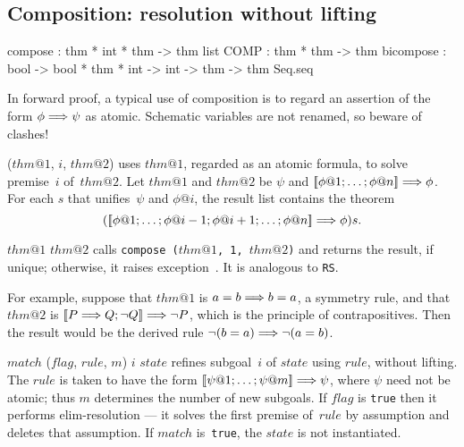 \subsection{Composition: resolution without lifting}
\begin{ttbox}
compose   : thm * int * thm -> thm list
COMP      : thm * thm -> thm
bicompose : bool -> bool * thm * int -> int -> thm
            -> thm Seq.seq
\end{ttbox}
In forward proof, a typical use of composition is to regard an assertion of
the form $\phi\Longrightarrow\psi$ as atomic.  Schematic variables are not renamed, so
beware of clashes!
\begin{ttdescription}
\item[\ttindexbold{compose} ($thm@1$, $i$, $thm@2$)] 
uses $thm@1$, regarded as an atomic formula, to solve premise~$i$
of~$thm@2$.  Let $thm@1$ and $thm@2$ be $\psi$ and $\List{\phi@1; \ldots;
\phi@n} \Imp \phi$.  For each $s$ that unifies~$\psi$ and $\phi@i$, the
result list contains the theorem
\[ (\List{\phi@1; \ldots; \phi@{i-1}; \phi@{i+1}; \ldots; \phi@n} \Imp \phi)s.
\]

\item[$thm@1$ \ttindexbold{COMP} $thm@2$] 
calls \hbox{\tt compose ($thm@1$, 1, $thm@2$)} and returns the result, if
unique; otherwise, it raises exception~\@.  It is
analogous to {\tt RS}\@.  

For example, suppose that $thm@1$ is $a=b\Longrightarrow b=a$, a symmetry rule, and
that $thm@2$ is $\mathopen{[\![} P\Longrightarrow Q; \neg Q\mathclose{]\!]} \Longrightarrow\neg P$, which is the
principle of contrapositives.  Then the result would be the
derived rule $\neg(b=a)\Longrightarrow\neg(a=b)$.

\item[\ttindexbold{bicompose} $match$ ($flag$, $rule$, $m$) $i$ $state$]
refines subgoal~$i$ of $state$ using $rule$, without lifting.  The $rule$
is taken to have the form $\List{\psi@1; \ldots; \psi@m} \Imp \psi$, where
$\psi$ need not be atomic; thus $m$ determines the number of new
subgoals.  If $flag$ is {\tt true} then it performs elim-resolution --- it
solves the first premise of~$rule$ by assumption and deletes that
assumption.  If $match$ is~{\tt true}, the $state$ is not instantiated.
\end{ttdescription}


